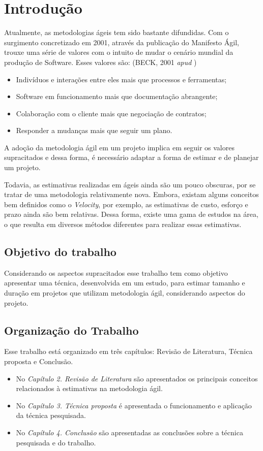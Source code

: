 \chapter[Introdução]{Introdução}

  Atualmente, as metodologias ágeis tem sido bastante difundidas. Com o surgimento concretizado em 2001, através
  da publicação do Manifesto Ágil, trouxe uma série de valores com o intuito de mudar o cenário mundial da produção de Software. Esses valores são: (BECK, 2001 \textit{apud} )
  
  \begin{itemize}
   \item Indivíduos e interações entre eles mais que processos e ferramentas;
   \item Software em funcionamento mais que documentação abrangente;
   \item Colaboração com o cliente mais que negociação de contratos;
   \item Responder a mudanças mais que seguir um plano.
  \end{itemize}
  
  A adoção da metodologia ágil em um projeto implica em seguir os valores supracitados e dessa forma,
  é necessário adaptar a forma de estimar e de planejar um projeto. 

  Todavia, as estimativas realizadas em ágeis ainda são um pouco obscuras, por se tratar de uma metodologia relativamente nova. Embora, existam alguns conceitos
  bem definidos como o \textit{Velocity}, por exemplo, as estimativas de custo, esforço e prazo ainda são bem relativas. Dessa forma, existe uma gama de estudos na área, o que resulta em diversos métodos diferentes para realizar essas estimativas.

\section{Objetivo do trabalho}

	Considerando os aspectos supracitados esse trabalho tem como objetivo apresentar uma técnica, desenvolvida em um estudo, para estimar tamanho e duração em projetos que utilizam metodologia ágil, considerando aspectos do projeto.

\section{Organização do Trabalho}

	Esse trabalho está organizado em três capítulos: Revisão de Literatura, Técnica proposta e Conclusão.

	\begin{itemize}
		\item No \textit{Capítulo 2. Revisão de Literatura} são apresentados os principais conceitos relacionados à estimativas na metodologia ágil.
    	\item No \textit{Capítulo 3. Técnica proposta} é apresentada o funcionamento e aplicação da técnica pesquisada.
    	\item No \textit{Capítulo 4. Conclusão} são apresentadas as conclusões sobre a técnica pesquisada e do trabalho.
	\end{itemize}


